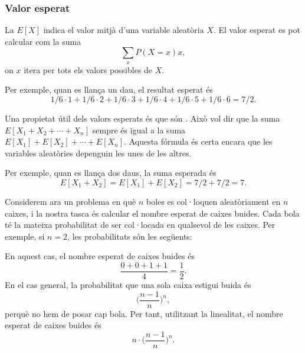 \subsubsection{Valor esperat}


La  $E[X]$ indica el valor mitjà d'una variable
aleatòria $X$. El valor esperat es pot calcular com la suma
\[\sum_x P(X=x)x,\]
on $x$ itera per tots els valors possibles de $X$.

Per exemple, quan es llança un dau, el resultat esperat és
\[1/6 \cdot 1 + 1/6 \cdot 2 + 1/6 \cdot 3 + 1/6 \cdot 4 + 1/6 \cdot 5 + 1/6 \cdot 6 = 7/2.\]


Una propietat útil dels valors esperats és que són . Això
vol dir que la suma $E[X_1+X_2+\cdots+X_n]$ sempre és igual a la suma
$E[X_1]+E[X_2]+\cdots+E[X_n]$. Aquesta fórmula és certa encara que les
variables aleatòries depenguin les unes de les altres.

Per exemple, quan es llança dos daus, la suma esperada és
\[E[X_1+X_2]=E[X_1]+E[X_2]=7/2+7/2=7.\]


Considerem ara un problema en què $n$ boles es col·loquen
aleatòriament en $n$ caixes, i la nostra tasca és calcular el nombre
esperat de caixes buides. Cada bola té la mateixa probabilitat de ser
col·locada en qualsevol de les caixes. Per exemple, si $n=2$, les
probabilitats són les següents:
\begin{center}
\end{center}
En aquest cas, el nombre esperat de caixes buides és
\[\frac{0+0+1+1}{4} = \frac{1}{2}.\]
En el cas general, la probabilitat que una sola caixa estigui buida és
\[\Big(\frac{n-1}{n}\Big)^n,\]
perquè no hem de posar cap bola. Per tant, utilitzant la linealitat,
el nombre esperat de caixes buides és
\[n \cdot \Big(\frac{n-1}{n}\Big)^n.\]


